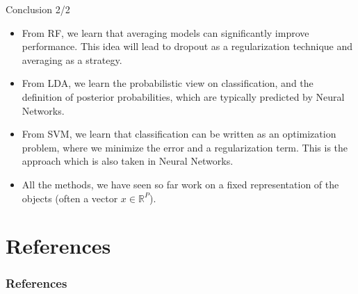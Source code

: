 \documentclass[xcolor=pdftex,dvipsnames,table]{beamer}
\begin{document}
\begin{frame}{Conclusion 2/2}
\begin{itemize}
	\item From RF, we learn that averaging models can significantly improve performance. This idea will lead to dropout as a regularization technique and averaging as a strategy. 
	\item From LDA, we learn the probabilistic view on classification, and the definition of posterior probabilities, which are typically predicted by Neural Networks. 
	\item From SVM, we learn that classification can be written as an optimization problem, where we minimize the error and a regularization term. This is the approach which is also taken in Neural Networks. 
	\item All the methods, we have seen so far work on a fixed representation of the objects (often a vector $x \in\mathbb{R}^P$).
\end{itemize}
\end{frame}

\section{References}
\begin{frame}[allowframebreaks]
	\frametitle{References}
	
\end{frame}
\end{document}
